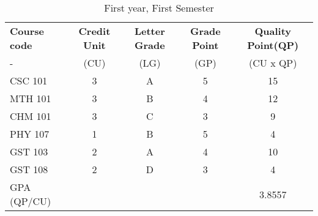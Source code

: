 \documentclass{article}
\begin{document}
	\begin{table}
		\caption{First year, First Semester}
		\label{tab:table1}
		\begin{tabular}{l|c|c|c|c}
			\textbf{Course code}&\textbf{Credit Unit}&\textbf{Letter Grade}&\textbf{Grade Point}&\textbf{Quality Point(QP)}\\
			-&(CU)&(LG)& (GP)& (CU x QP)\\
			\hline
			CSC 101 &3&A&5&15\\
			MTH 101 &3&B&4&12\\
			CHM 101 &3&C&3&9\\
			PHY 107 &1&B&5&4\\
			GST 103 &2&A&4&10\\
			GST 108 &2&D&3&4\\
			GPA (QP/CU)&&&&3.8557
			
		\end{tabular}
	\end{table}
\end{document}
